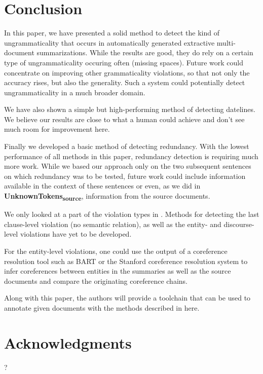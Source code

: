\documentclass[a4paper,10pt]{scrartcl}
\theoremstyle{style}
\begin{document}
\section{Conclusion} %
\label{conclusion}

In this paper, we have presented a solid method to detect the kind of ungrammaticality that occurs in automatically generated extractive multi-document summarizations. While the results are good, they do rely on a certain type of ungrammaticality occuring often (missing spaces). Future work could concentrate on improving other grammaticality violations, so that not only the accuracy rises, but also the generality. Such a system could potentially detect ungrammaticality in a much broader domain.

We have also shown a simple but high-performing method of detecting datelines. We believe our results are close to what a human could achieve and don't see much room for improvement here.

Finally we developed a basic method of detecting redundancy. With the lowest performance of all methods in this paper, redundancy detection is requiring much more work. While we based our approach only on the two subsequent sentences on which redundancy was to be tested, future work could include information available in the context of these sentences or even, as we did in \textbf{UnknownTokens\textsubscript{source}}, information from the source documents.

We only looked at a part of the violation types in \cite{friedrichlqvsumm}. Methods for detecting the last clause-level violation (no semantic relation), as well as the entity- and discourse-level violations have yet to be developed.

For the entity-level violations, one could use the output of a coreference resolution tool such as BART \citep{versley2008bart} or the Stanford coreference resolution system \citep{lee2011stanford} to infer coreferences between entities in the summaries as well as the source documents and compare the originating coreference chains.

Along with this paper, the authors will provide a toolchain that can be used to annotate given documents with the methods described in here.

\section*{Acknowledgments}

?

\newpage


\end{document}
